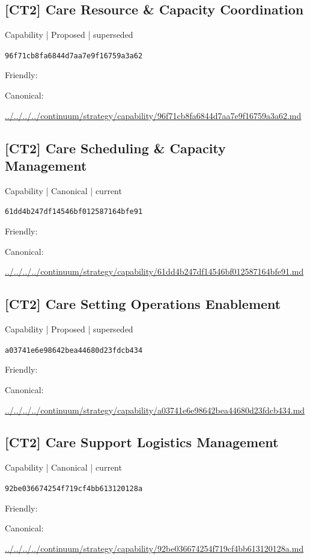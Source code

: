 \documentclass[10pt,a4paper]{article}
\begin{document}
\subsection*{[CT2] Care Resource \& Capacity Coordination}
{\small Capability | Proposed | superseded}\par
\texttt{96f71cb8fa6844d7aa7e9f16759a3a62}\par
Friendly: \par
Canonical: \par
{\footnotesize\url{../../../../continuum/strategy/capability/96f71cb8fa6844d7aa7e9f16759a3a62.md}}\par
\subsection*{[CT2] Care Scheduling \& Capacity Management}
{\small Capability | Canonical | current}\par
\texttt{61dd4b247df14546bf012587164bfe91}\par
Friendly: \par
Canonical: \par
{\footnotesize\url{../../../../continuum/strategy/capability/61dd4b247df14546bf012587164bfe91.md}}\par
\subsection*{[CT2] Care Setting Operations Enablement}
{\small Capability | Proposed | superseded}\par
\texttt{a03741e6e98642bea44680d23fdcb434}\par
Friendly: \par
Canonical: \par
{\footnotesize\url{../../../../continuum/strategy/capability/a03741e6e98642bea44680d23fdcb434.md}}\par
\subsection*{[CT2] Care Support Logistics Management}
{\small Capability | Canonical | current}\par
\texttt{92be036674254f719cf4bb613120128a}\par
Friendly: \par
Canonical: \par
{\footnotesize\url{../../../../continuum/strategy/capability/92be036674254f719cf4bb613120128a.md}}\par
\end{document}
